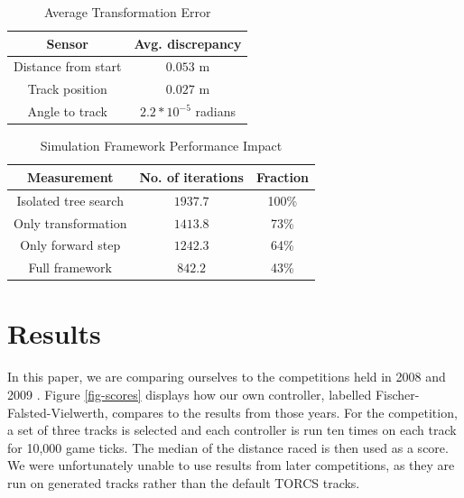 \documentclass[conference]{IEEEtran}
\begin{document}
\begin{table}
\begin{center}
\renewcommand{\arraystretch}{1.3}
\caption{Average Transformation Error}
\label{tab-accuracy}
\begin{tabular}{|c|c|} \hline
\textbf{Sensor} & \textbf{Avg. discrepancy} \\ \hline
Distance from start & $0.053$ m \\ \hline
Track position & $0.027$ m \\ \hline
Angle to track & $2.2*10^{-5}$ radians \\ \hline
\end{tabular}
\end{center}
\end{table}

\begin{table}
\begin{center}
\renewcommand{\arraystretch}{1.3}
\caption{Simulation Framework Performance Impact}
\label{tab-performance}
\begin{tabular}{|c|c|c|} \hline
\textbf{Measurement} & \textbf{No. of iterations} & \textbf{Fraction} \\ \hline
Isolated tree search & $1937.7$ & 100\% \\ \hline
Only transformation & $1413.8$ & 73\% \\ \hline
Only forward step & $1242.3$ & 64\% \\ \hline
Full framework & $842.2$ & 43\% \\ \hline
\end{tabular}
\end{center}
\end{table}

\section{Results}
\label{sec-results}

In this paper, we are comparing ourselves to the competitions held in 2008 \cite{2008championship} and 2009 \cite{2009championship}. Figure \ref{fig-scores} displays how our own controller, labelled Fischer-Falsted-Vielwerth, compares to the results from those years. For the competition, a set of three tracks is selected and each controller is run ten times on each track for 10,000 game ticks. The median of the distance raced is then used as a score. We were unfortunately unable to use results from later competitions, as they are run on generated tracks rather than the default TORCS tracks.
\end{document}
